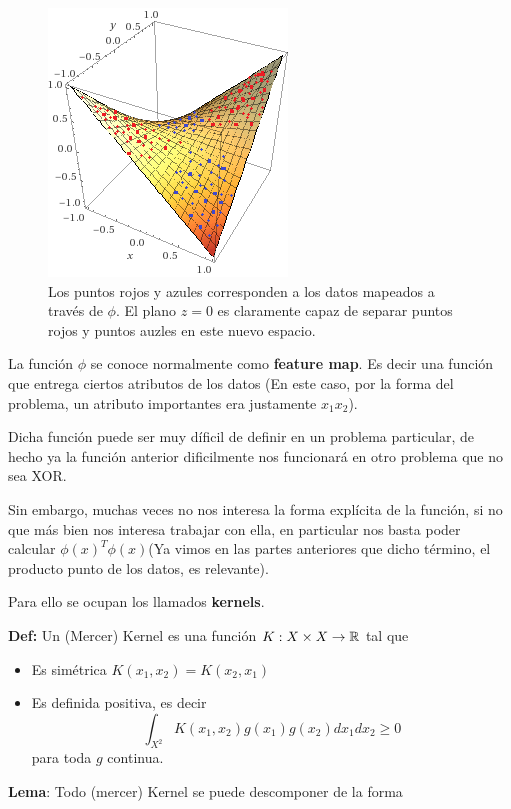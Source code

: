 \begin{figure}[ht]
    \centering
    \includegraphics{img/mapeo.png}
    \caption{Los puntos rojos y azules corresponden a los datos mapeados a través de $\phi$. El plano $z=0$ es claramente capaz de separar puntos rojos y puntos auzles en este nuevo espacio.}
    \label{fig:my_label6}
\end{figure}


La función $\phi$ se conoce normalmente como \textbf{feature map}. Es decir una función que entrega ciertos atributos de los datos (En este caso, por la forma del problema, un atributo importantes era justamente $x_1x_2$).

Dicha función puede ser muy díficil de definir en un problema particular, de hecho ya la función anterior dificilmente nos funcionará en otro problema que no sea XOR. 

Sin embargo, muchas veces no nos interesa la forma explícita de la función, si no que más bien nos interesa trabajar con ella, en particular nos basta poder calcular $\phi(x)^{T} \phi(x)$(Ya vimos en las partes anteriores que dicho término, el producto punto de los datos, es relevante). 

Para ello se ocupan los llamados \textbf{kernels}.

\textbf{Def:} Un (Mercer) Kernel es una función $K: X\times X \to {\mathbb R}$ tal que
\begin{itemize}
    \item Es simétrica $K(x_1 , x_2 ) = K (x_2 , x_1)$
    \item Es definida positiva, es decir
    $$\int_{X^2} K(x_1, x_2)g(x_1) g(x_2) dx_1 dx_2\geq 0$$
    para toda $g$ continua. 
\end{itemize}

\textbf{Lema}: Todo (mercer) Kernel se puede descomponer de la forma

